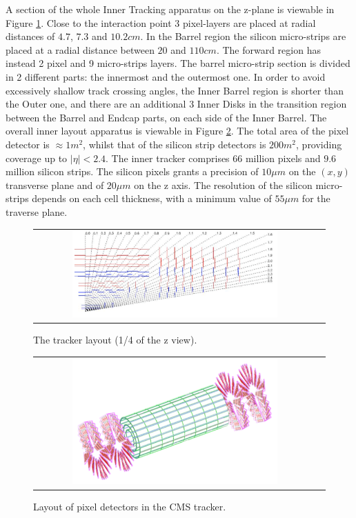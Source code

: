 A section of the whole Inner Tracking apparatus on the z-plane is viewable in Figure \ref{fig:Pixel_zview}. Close to the interaction point 3 pixel-layers are placed at radial distances of $4.7$, $7.3$ and $10.2 cm$. In the Barrel region the silicon micro-strips are placed at a radial distance between $20$ and $110 cm$. The forward region has instead 2 pixel and 9 micro-strips layers. The barrel micro-strip section is divided in 2 different parts: the innermost and the outermost one. In order to avoid excessively shallow track crossing angles, the Inner Barrel region is shorter than the Outer one, and there are an additional 3 Inner Disks in the transition region between the Barrel and Endcap parts, on each side of the Inner Barrel. The overall inner layout apparatus is viewable in Figure \ref{fig:Pixel_layout}. The total area of the pixel detector is $\approx 1 m^{2}$, whilst that of the silicon strip detectors is $200 m^{2}$, providing coverage up to $|\eta| < 2.4$. The inner tracker comprises 66 million pixels and $9.6$ million silicon strips. The silicon pixels grants a precision of $10 \mu m$ on the $(x,y)$ transverse plane and of $20 \mu m$ on the z axis. The resolution of the silicon micro-strips depends on each cell thickness, with a minimum value of $ 55 \mu m$ for the traverse plane.


\begin{figure}[tbh!]
	\centering
	\begin{tabular}{cc}
		\includegraphics[width=0.75\textwidth]{detector/pics/Pixel_zview.pdf}
	\end{tabular}
	\caption{The tracker layout (1/4 of the z view).}
	\label{fig:Pixel_zview}
\end{figure}

\begin{figure}[tbh!]
	\centering
	\begin{tabular}{cc}
		\includegraphics[width=0.75\textwidth]{detector/pics/Pixel_layout.pdf}
	\end{tabular}
	\caption{Layout of pixel detectors in the CMS tracker.}
	\label{fig:Pixel_layout}
\end{figure}

